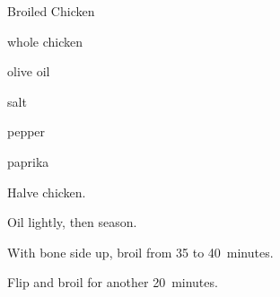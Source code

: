\begin{recipe}{Broiled Chicken}{}{}

\begin{ingredients}
\item whole chicken
\item olive oil
\item salt
\item pepper
\item paprika
\end{ingredients}

\begin{directions}
\item Halve chicken.
\item Oil lightly, then season.
\item With bone side up, broil from 35 to 40~minutes.
\item Flip and broil for another 20~minutes.
\end{directions}

\end{recipe}
